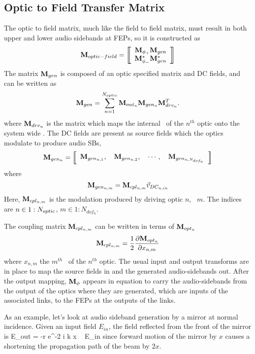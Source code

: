 \documentclass[12pt]{article}
\begin{document}
\subsection{Optic to Field Transfer Matrix}
The optic to field matrix, much like the field to field matrix, must result in both upper and lower audio sidebands at FEPs, so it is constructed as
\begin{equation}
\matm{optic-field} =
\matrixBegin{c}
 \mPhin{+} \mGen \\
 \mPhin{-}^* \mGen^* \\
\matrixEnd
\elabel{mOF}
\end{equation}
The matrix $\mathbf{M}_{gen}$ is composed of an optic specified matrix and DC fields, and can be written as
\begin{equation}
\mathbf{M}_{gen} = \sum_{n=1}^{N_{optic}} {\mathbf{M}_{out_{n}} \mathbf{M}_{gen_{n}} \mathbf{M}_{drv_{n}}^{T}}.
\end{equation}
where $\mathbf{M}_{drv_{n}}$ is the matrix which maps the internal \dsf\ of the $n^{th}$ optic onto the system wide \dsf. The DC fields are present as source fields which the optics modulate to produce audio SBs,
\begin{equation}
\mGenn{n} = \matrixBegin{c}
\mGenn{n,1} , ~~~ \mGenn{n,2} , ~~~ \cdots , ~~~ \mGenn{n,N_{dof_n}}
\matrixEnd \elabel{mGen}
\end{equation}
where
\begin{equation}
\mathbf{M}_{gen_{n,m}} = \mathbf{M}_{cpl_{n,m}} \vec{v}_{DC_{n,in}}
\end{equation}
Here, $\mathbf{M}_{cpl_{n,m}}$ is the modulation produced by driving optic $n$, \dof\ $m$.
The indices are $n \in 1:N_{optic}$, $m \in 1:N_{dof_n}$.

The coupling matrix $\mathbf{M}_{cpl_{n,m}}$ can be written in terms of $\mathbf{M}_{opt_{n}}$
\begin{equation}
\mCpln{n,m} = \frac{1}{2} \partderiv{\mOptn{n}}{x_{n,m}}
\elabel{mDrv}
\end{equation}
where $x_{n,m}$ the $m^{th}$ \dof\ of the $n^{th}$ optic. The usual input and output transforms are in place to map the source fields in and the generated audio-sidebands out.
After the output mapping, $\mathbf{M}_{\phi}$ appears in equation  to carry the audio-sidebands from the output of the optics where they are generated, which are inputs of the associated links, to the FEPs at the outputs of the links.

As an example, let's look at audio sideband generation by a mirror at normal incidence.
Given an input field $E_{in}$, the field reflected from the front of the mirror is
E_{out} = -r e^{-2 i k x} ~ E_{in}
\eeq
 since forward motion of the mirror by $x$ causes a shortening the propagation path of the beam by $2 x$.
\end{document}
